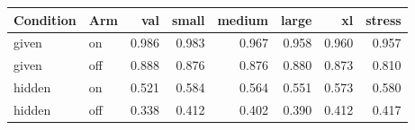 \begin{tabular}{llrrrrrr}
\toprule
Condition & Arm & val & small & medium & large & xl & stress \\
\midrule
given & on & 0.986 & 0.983 & 0.967 & 0.958 & 0.960 & 0.957 \\
given & off & 0.888 & 0.876 & 0.876 & 0.880 & 0.873 & 0.810 \\
hidden & on & 0.521 & 0.584 & 0.564 & 0.551 & 0.573 & 0.580 \\
hidden & off & 0.338 & 0.412 & 0.402 & 0.390 & 0.412 & 0.417 \\
\bottomrule
\end{tabular}
